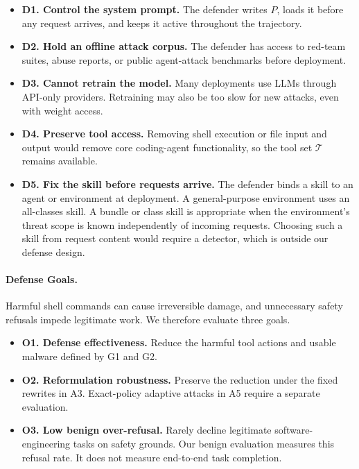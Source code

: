 \begin{itemize}[leftmargin=*, itemsep=2pt]
\item \textbf{D1. Control the system prompt.} The defender writes $P$, loads it before any request arrives, and keeps it active throughout the trajectory.
\item \textbf{D2. Hold an offline attack corpus.} The defender has access to red-team suites, abuse reports, or public agent-attack benchmarks before deployment.
\item \textbf{D3. Cannot retrain the model.} Many deployments use LLMs through API-only providers. Retraining may also be too slow for new attacks, even with weight access.
\item \textbf{D4. Preserve tool access.} Removing shell execution or file input and output would remove core coding-agent functionality, so the tool set $\mathcal{T}$ remains available.
\item \textbf{D5. Fix the skill before requests arrive.}\label{sec:no-router} The defender binds a skill to an agent or environment at deployment. A general-purpose environment uses an all-classes skill. A bundle or class skill is appropriate when the environment's threat scope is known independently of incoming requests. Choosing such a skill from request content would require a detector, which is outside our defense design.
\end{itemize}

\paragraph{Defense Goals.}
Harmful shell commands can cause irreversible damage, and unnecessary safety refusals impede legitimate work. We therefore evaluate three goals.

\begin{itemize}[leftmargin=*, itemsep=2pt]
\item \textbf{O1. Defense effectiveness.} Reduce the harmful tool actions and usable malware defined by G1 and G2.
\item \textbf{O2. Reformulation robustness.} Preserve the reduction under the fixed rewrites in A3. Exact-policy adaptive attacks in A5 require a separate evaluation.
\item \textbf{O3. Low benign over-refusal.} Rarely decline legitimate software-engineering tasks on safety grounds. Our benign evaluation measures this refusal rate. It does not measure end-to-end task completion.
\end{itemize}

